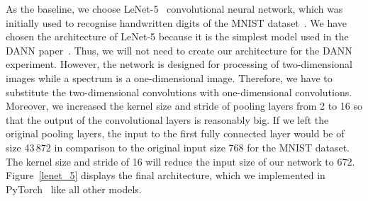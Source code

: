 As the baseline, we choose LeNet-5~\cite{lecun1998} convolutional neural network,
which was initially used to recognise handwritten digits of the MNIST dataset~\cite{lecun1998}.
We have chosen the architecture of LeNet-5
because it is the simplest model used in the DANN paper~\cite{ganin2016}.
Thus, we will not need to create our architecture for the DANN experiment.
However, the network is designed for processing of two-dimensional images
while a spectrum is a one-dimensional image.
Therefore, we have to substitute the two-dimensional convolutions with one-dimensional convolutions.
Moreover, we increased the kernel size and stride of pooling layers from 2 to 16
so that the output of the convolutional layers is reasonably big.
If we left the original pooling layers,
the input to the first fully connected layer would be of size 43\,872
in comparison to the original input size 768 for the MNIST dataset.
The kernel size and stride of 16 will reduce the input size of our network to 672.
Figure~\ref{lenet_5} displays the final architecture,
which we implemented in PyTorch~\cite{paszke2019} like all other models.

